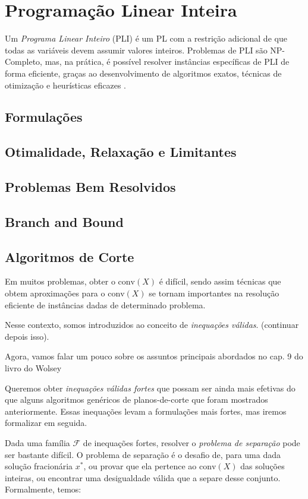 \documentclass[12pt,a4paper]{article}
\begin{document}
\section{Programação Linear Inteira}

Um \emph{Programa Linear Inteiro} (PLI) é um PL com a restrição adicional de que todas as variáveis devem assumir valores inteiros. Problemas de PLI são NP-Completo, mas, na prática, é possível resolver instâncias específicas de PLI de forma eficiente, graças ao desenvolvimento de algoritmos exatos, técnicas de otimização e heurísticas eficazes \cite{Wolsey2021}.


\subsection{Formulações}
\subsection{Otimalidade, Relaxação e Limitantes}
\subsection{Problemas Bem Resolvidos}
\subsection{Branch and Bound}
\subsection{Algoritmos de Corte}

Em muitos problemas, obter o $\mathrm{conv}(X)$ é difícil, sendo assim técnicas que obtem aproximações para o $\mathrm{conv}(X)$ se tornam importantes na resolução eficiente de instâncias dadas de determinado problema.

Nesse contexto, somos introduzidos ao conceito de \emph{inequações válidas}. (continuar depois isso).

Agora, vamos falar um pouco sobre os assuntos principais abordados no cap. 9 do livro do Wolsey \cite{Wolsey2021}

Queremos obter \emph{inequações válidas fortes} que possam ser ainda mais efetivas do que alguns algoritmos genéricos de planos-de-corte que foram mostrados anteriormente. Essas inequações levam a formulações mais fortes, mas iremos formalizar em seguida.
 
Dada uma família $\mathcal{F}$ de inequações fortes, resolver o \emph{problema de separação} pode ser bastante difícil. O problema de separação é o desafio de, para uma dada solução fracionária $x^*$, ou provar que ela pertence ao  $\mathrm{conv}(X)$ das soluções inteiras, ou encontrar uma desigualdade válida que a separe desse conjunto.  Formalmente, temos:
\end{document}
